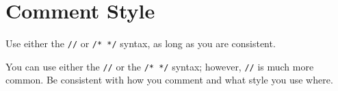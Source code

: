 
\section{Comment Style}\label{sec:comment-style}
Use either the \texttt{//} or \texttt{/* */} syntax, as long as you are consistent.

You can use either the \texttt{//} or the \texttt{/* */} syntax; however, \texttt{//} is much more common. Be consistent with how you comment and what style you use where.

